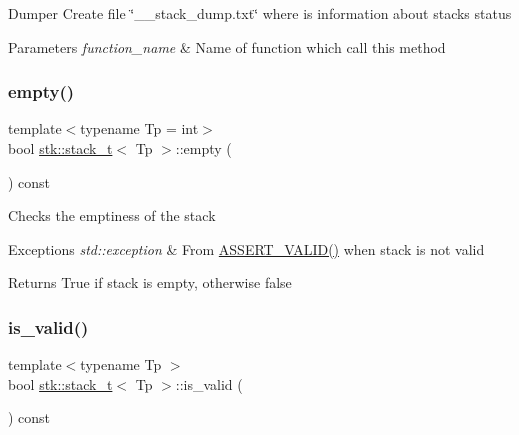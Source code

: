 Dumper Create file \char`\"{}\+\_\+\+\_\+stack\+\_\+dump.\+txt\char`\"{} where is information about stack\textquotesingle{}s status 
\begin{DoxyParams}{Parameters}
{\em function\+\_\+name} & Name of function which call this method \\
\hline
\end{DoxyParams}
\mbox{\label{classstk_1_1stack__t_ab4878c2c4a3b11d35b67323a0f473813}} 
\subsubsection{\texorpdfstring{empty()}{empty()}}
{\footnotesize\ttfamily template$<$typename Tp = int$>$ \\
bool \hyperlink{classstk_1_1stack__t}{stk\+::stack\+\_\+t}$<$ Tp $>$\+::empty (\begin{DoxyParamCaption}{ }\end{DoxyParamCaption}) const\hspace{0.3cm}{\ttfamily [inline]}}

Checks the emptiness of the stack 
\begin{DoxyExceptions}{Exceptions}
{\em std\+::exception} & From \hyperlink{stack_8h_a4ad7af85cae2910ffcf6bfbcb8278886}{A\+S\+S\+E\+R\+T\+\_\+\+V\+A\+L\+I\+D()} when stack is not valid \\
\hline
\end{DoxyExceptions}
\begin{DoxyReturn}{Returns}
True if stack is empty, otherwise false 
\end{DoxyReturn}
\mbox{\label{classstk_1_1stack__t_a981df1d2676a6253d943c8b42db6e8f0}} 
\subsubsection{\texorpdfstring{is\+\_\+valid()}{is\_valid()}}
{\footnotesize\ttfamily template$<$typename Tp $>$ \\
bool \hyperlink{classstk_1_1stack__t}{stk\+::stack\+\_\+t}$<$ Tp $>$\+::is\+\_\+valid (\begin{DoxyParamCaption}{ }\end{DoxyParamCaption}) const\hspace{0.3cm}{\ttfamily [private]}}

